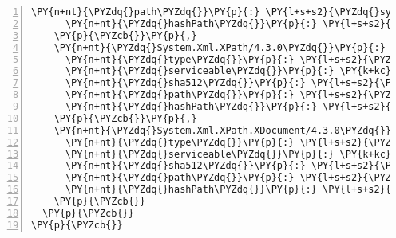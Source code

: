 \begin{Verbatim}[commandchars=\\\{\},numbers=left,firstnumber=1,stepnumber=1,numberblanklines=0]
      \PY{n+nt}{\PYZdq{}path\PYZdq{}}\PY{p}{:} \PY{l+s+s2}{\PYZdq{}system.xml.xmlserializer/4.3.0\PYZdq{}}\PY{p}{,}
      \PY{n+nt}{\PYZdq{}hashPath\PYZdq{}}\PY{p}{:} \PY{l+s+s2}{\PYZdq{}system.xml.xmlserializer.4.3.0.nupkg.sha512\PYZdq{}}
    \PY{p}{\PYZcb{}}\PY{p}{,}
    \PY{n+nt}{\PYZdq{}System.Xml.XPath/4.3.0\PYZdq{}}\PY{p}{:} \PY{p}{\PYZob{}}
      \PY{n+nt}{\PYZdq{}type\PYZdq{}}\PY{p}{:} \PY{l+s+s2}{\PYZdq{}package\PYZdq{}}\PY{p}{,}
      \PY{n+nt}{\PYZdq{}serviceable\PYZdq{}}\PY{p}{:} \PY{k+kc}{true}\PY{p}{,}
      \PY{n+nt}{\PYZdq{}sha512\PYZdq{}}\PY{p}{:} \PY{l+s+s2}{\PYZdq{}sha512\PYZhy{}v1JQ5SETnQusqmS3RwStF7vwQ3L02imIzl++sewmt23VGygix04pEH+FCj1yWb+z4GDzKiljr1W7Wfvrx0YwgA==\PYZdq{}}\PY{p}{,}
      \PY{n+nt}{\PYZdq{}path\PYZdq{}}\PY{p}{:} \PY{l+s+s2}{\PYZdq{}system.xml.xpath/4.3.0\PYZdq{}}\PY{p}{,}
      \PY{n+nt}{\PYZdq{}hashPath\PYZdq{}}\PY{p}{:} \PY{l+s+s2}{\PYZdq{}system.xml.xpath.4.3.0.nupkg.sha512\PYZdq{}}
    \PY{p}{\PYZcb{}}\PY{p}{,}
    \PY{n+nt}{\PYZdq{}System.Xml.XPath.XDocument/4.3.0\PYZdq{}}\PY{p}{:} \PY{p}{\PYZob{}}
      \PY{n+nt}{\PYZdq{}type\PYZdq{}}\PY{p}{:} \PY{l+s+s2}{\PYZdq{}package\PYZdq{}}\PY{p}{,}
      \PY{n+nt}{\PYZdq{}serviceable\PYZdq{}}\PY{p}{:} \PY{k+kc}{true}\PY{p}{,}
      \PY{n+nt}{\PYZdq{}sha512\PYZdq{}}\PY{p}{:} \PY{l+s+s2}{\PYZdq{}sha512\PYZhy{}jw9oHHEIVW53mHY9PgrQa98Xo2IZ0ZjrpdOTmtvk+Rvg4tq7dydmxdNqUvJ5YwjDqhn75mBXWttWjiKhWP53LQ==\PYZdq{}}\PY{p}{,}
      \PY{n+nt}{\PYZdq{}path\PYZdq{}}\PY{p}{:} \PY{l+s+s2}{\PYZdq{}system.xml.xpath.xdocument/4.3.0\PYZdq{}}\PY{p}{,}
      \PY{n+nt}{\PYZdq{}hashPath\PYZdq{}}\PY{p}{:} \PY{l+s+s2}{\PYZdq{}system.xml.xpath.xdocument.4.3.0.nupkg.sha512\PYZdq{}}
    \PY{p}{\PYZcb{}}
  \PY{p}{\PYZcb{}}
\PY{p}{\PYZcb{}}
\end{Verbatim}
